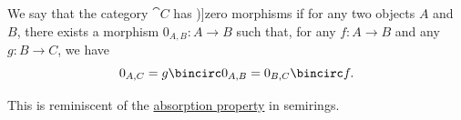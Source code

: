 \begin{definition}\label{def:zero_morphism}
  We say that the category \( \cat{C} \) has \term[en=zero arrow (\cite[20]{MacLane1998CategoryTheory})]{zero morphisms} if for any two objects \( A \) and \( B \), there exists a morphism \( 0_{A,B}: A \to B \) such that, for any \( f: A \to B \) and any \( g: B \to C \), we have
  \begin{equation}\label{eq:def:zero_morphism}
    0_{A,C} = g \bincirc 0_{A,B} = 0_{B,C} \bincirc f.
  \end{equation}
\end{definition}
\begin{comments}
  \item This is reminiscent of the \hyperref[def:semigroup_absorbing_element]{absorption property} in semirings.
\end{comments}

